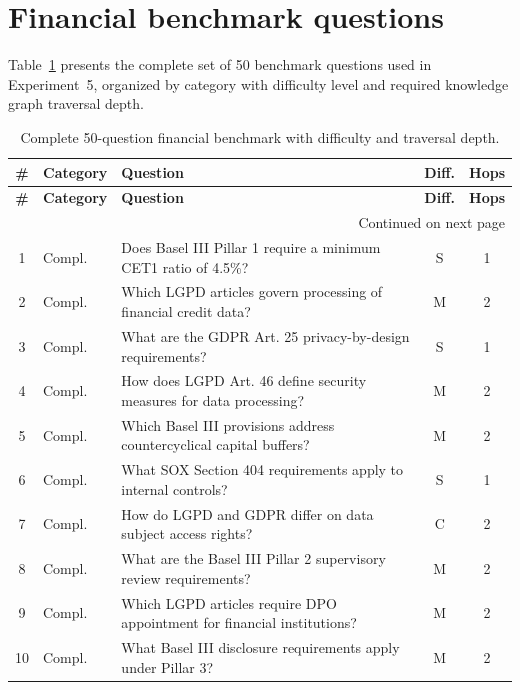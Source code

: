 \documentclass[review]{elsarticle}
\begin{document}
\section{Financial benchmark questions}
\label{app:benchmark-full}

Table~\ref{tab:benchmark-full} presents the complete set of 50 benchmark questions used in Experiment~5, organized by category with difficulty level and required knowledge graph traversal depth.

\begin{longtable}{@{}clp{6cm}cc@{}}
\caption{Complete 50-question financial benchmark with difficulty and traversal depth.}
\label{tab:benchmark-full} \\
\toprule
\textbf{\#} & \textbf{Category} & \textbf{Question} & \textbf{Diff.} & \textbf{Hops} \\
\midrule
\endfirsthead
\toprule
\textbf{\#} & \textbf{Category} & \textbf{Question} & \textbf{Diff.} & \textbf{Hops} \\
\midrule
\endhead
\midrule
\multicolumn{5}{r}{\footnotesize Continued on next page} \\
\endfoot
\bottomrule
\endlastfoot
1 & Compl. & Does Basel III Pillar 1 require a minimum CET1 ratio of 4.5\%? & S & 1 \\
2 & Compl. & Which LGPD articles govern processing of financial credit data? & M & 2 \\
3 & Compl. & What are the GDPR Art. 25 privacy-by-design requirements? & S & 1 \\
4 & Compl. & How does LGPD Art. 46 define security measures for data processing? & M & 2 \\
5 & Compl. & Which Basel III provisions address countercyclical capital buffers? & M & 2 \\
6 & Compl. & What SOX Section 404 requirements apply to internal controls? & S & 1 \\
7 & Compl. & How do LGPD and GDPR differ on data subject access rights? & C & 2 \\
8 & Compl. & What are the Basel III Pillar 2 supervisory review requirements? & M & 2 \\
9 & Compl. & Which LGPD articles require DPO appointment for financial institutions? & M & 2 \\
10 & Compl. & What Basel III disclosure requirements apply under Pillar 3? & M & 2 \\

\end{longtable}
\end{document}
